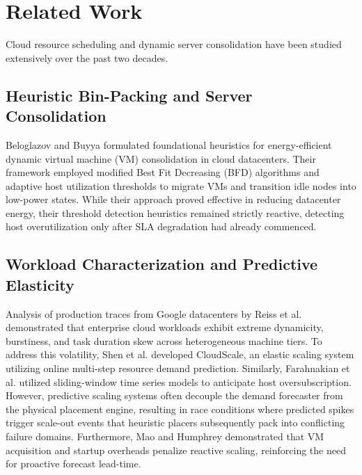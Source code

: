 \documentclass[conference]{IEEEtran}
\begin{document}
\section{Related Work}
Cloud resource scheduling and dynamic server consolidation have been studied extensively over the past two decades.

\subsection{Heuristic Bin-Packing and Server Consolidation}
Beloglazov and Buyya \cite{beloglazov2012optimal} formulated foundational heuristics for energy-efficient dynamic virtual machine (VM) consolidation in cloud datacenters. Their framework employed modified Best Fit Decreasing (BFD) algorithms and adaptive host utilization thresholds to migrate VMs and transition idle nodes into low-power states. While their approach proved effective in reducing datacenter energy, their threshold detection heuristics remained strictly reactive, detecting host overutilization only after SLA degradation had already commenced.

\subsection{Workload Characterization and Predictive Elasticity}
Analysis of production traces from Google datacenters by Reiss et al. \cite{reiss2012heterogeneity} demonstrated that enterprise cloud workloads exhibit extreme dynamicity, burstiness, and task duration skew across heterogeneous machine tiers. To address this volatility, Shen et al. \cite{shen2011cloudscale} developed CloudScale, an elastic scaling system utilizing online multi-step resource demand prediction. Similarly, Farahnakian et al. \cite{farahnakian2014energy} utilized sliding-window time series models to anticipate host oversubscription. However, predictive scaling systems often decouple the demand forecaster from the physical placement engine, resulting in race conditions where predicted spikes trigger scale-out events that heuristic placers subsequently pack into conflicting failure domains. Furthermore, Mao and Humphrey \cite{mao2012performance} demonstrated that VM acquisition and startup overheads penalize reactive scaling, reinforcing the need for proactive forecast lead-time.
\end{document}
